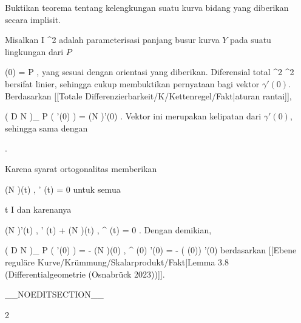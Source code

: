 {

Buktikan teorema tentang kelengkungan suatu kurva bidang yang diberikan secara implisit.

}
{

Misalkan
\maabb {\gamma} { I } { \R^2
} {}
adalah parameterisasi panjang busur kurva $Y$ pada suatu lingkungan dari $P$

\mavergleichskette
{\vergleichskette
{ \gamma (0)
}
{ = }{ P
}
{ }{
}
{ }{
}
{ }{
}
}
{}{}{,}
yang sesuai dengan orientasi yang diberikan. Diferensial total
 { \R^2} {\R^2
} {}
bersifat linier, sehingga cukup membuktikan pernyataan bagi vektor $\gamma'(0)$. Berdasarkan
[[Totale Differenzierbarkeit/K/Kettenregel/Fakt|aturan rantai]],

\mavergleichskettedisp
{\vergleichskette
{ \left(  D N   \right)_{ P } \left(   \gamma'(0)  \right)
}
{ =} { (N \circ \gamma )'(0)
}
{ } {
}
{ } {
}
{ } {
}
}
{}{}{.}
Vektor ini merupakan kelipatan dari $\gamma'(0)$, sehingga sama dengan

 { . }

Karena syarat ortogonalitas memberikan

\mavergleichskettedisp
{\vergleichskette
{ \left\langle (N \circ \gamma)(t) , \gamma' (t) \right\rangle
}
{ =} { 0
}
{ } {
}
{ } {
}
{ } {
}
}
{}{}{}
untuk semua

\mavergleichskette
{\vergleichskette
{ t
}
{ \in }{ I
}
{ }{
}
{ }{
}
{ }{
}
}
{}{}{}
dan karenanya

\mavergleichskettedisp
{\vergleichskette
{ \left\langle (N \circ \gamma)'(t) , \gamma' (t) \right\rangle + \left\langle (N \circ \gamma)(t) , \gamma^{\prime \prime} (t) \right\rangle
}
{ =} { 0
}
{ } {
}
{ } {
}
{ } {
}
}
{}{}{.}
Dengan demikian,

\mavergleichskettedisp
{\vergleichskette
{ \left(  D N   \right)_{ P } \left(   \gamma'(0)  \right)
}
{ =} { - \left\langle  (N \circ  \gamma)(0) ,  \gamma^{\prime \prime} (0)   \right\rangle  \gamma'(0)
}
{ =} { - \kappa( \gamma(0)) \gamma'(0)
}
{ } {
}
{ } {
}
}
{}{}{}
berdasarkan
[[Ebene reguläre Kurve/Krümmung/Skalarprodukt/Fakt|Lemma 3.8 (Differentialgeometrie (Osnabrück 2023))]].

 }

__NOEDITSECTION__

{2}

